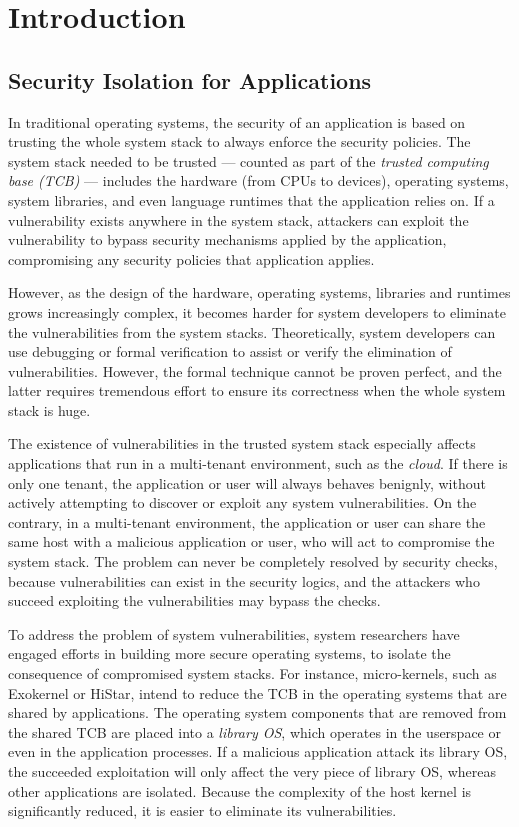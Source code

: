 \chapter{Introduction}
\label{chap:intro}

\section{Security Isolation for Applications}
\label{sec:intro:isolation}

In traditional operating systems, the security of an application is based on
trusting the whole system stack to always enforce the security policies.
The system stack needed to be trusted
--- counted as part of the {\em trusted computing base (TCB)}
--- includes the hardware (from CPUs to devices), operating systems, system libraries,
and even language runtimes that the application relies on.
If a vulnerability exists anywhere in the system stack,
attackers can exploit the vulnerability to bypass security mechanisms applied by the application,
compromising any security policies that application applies.

However, as the design of the hardware, operating systems, libraries and runtimes grows increasingly complex,
it becomes harder for system developers to eliminate the vulnerabilities
from the system stacks.
Theoretically, system developers can use debugging or formal verification
to assist or verify the elimination of vulnerabilities.
However, the formal technique cannot be proven perfect, and the latter requires tremendous effort to ensure its correctness
when the whole system stack is huge.

The existence of vulnerabilities in the trusted system stack especially affects applications that run in a multi-tenant environment, such as the {\em cloud}.
If there is only one tenant,
the application or user will always behaves benignly,
without actively attempting to discover or exploit any system vulnerabilities.
On the contrary, in a multi-tenant environment,
the application or user can share the same host with a malicious application or user,
who will act to compromise the system stack.
The problem can never be completely resolved by security checks,
because vulnerabilities can exist in the security logics,
and the attackers who succeed exploiting the vulnerabilities may bypass the checks.

To address the problem of system vulnerabilities, system researchers have engaged efforts in building more secure operating systems,
to isolate the consequence of compromised system stacks.
For instance,
micro-kernels, such as Exokernel or HiStar,
intend to reduce the TCB in the operating systems that are shared by applications.
The operating system components that are removed from the shared TCB are placed into a {\em library OS}, which operates in the userspace or even in the application processes.
If a malicious application attack its library OS,
the succeeded exploitation will only affect the very piece of library OS,
whereas other applications are isolated.
Because the complexity of the host kernel is significantly reduced,
it is easier to eliminate its vulnerabilities.

